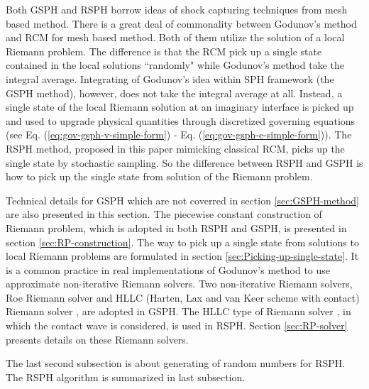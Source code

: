 Both GSPH and RSPH borrow ideas of shock capturing techniques from mesh based method. There is a great deal of commonality between Godunov's method and RCM for mesh based method. Both of them utilize the solution of a local Riemann problem. The difference is that the RCM pick up a single state contained in the local solutions ``randomly" while Godunov's method take the integral average. 
Integrating of Godunov's idea within SPH framework (the GSPH method), however, does not take the integral average at all. Instead, a single state of the local Riemann solution at an imaginary interface is picked up and used to upgrade physical quantities through discretized governing equations (see Eq. (\ref{eq:gov-gsph-v-simple-form}) - Eq. (\ref{eq:gov-gsph-e-simple-form})). The RSPH method, proposed in this paper mimicking classical RCM, picks up the single state by stochastic sampling. So the difference between RSPH and GSPH is how to pick up the single state from solution of the Riemann problem.

Technical details for GSPH which are not coverred in section \ref{sec:GSPH-method} are also presented in this section.
The piecewise constant construction of Riemann problem, which is adopted in both RSPH and GSPH, is presented in section \ref{sec:RP-construction}. The way to pick up a single state from solutions to local Riemann problems are formulated in section \ref{sec:Picking-up-single-state}. It is a common practice in real implementations of Godunov's method to use approximate non-iterative Riemann solvers.
Two non-iterative Riemann solvers, Roe Riemann solver and HLLC (Harten, Lax and van Keer scheme with contact) Riemann solver \citep{toro1994restoration}, are adopted in GSPH. The HLLC type of Riemann solver \citep{toro1994restoration}, in which the contact wave is considered, is used in RSPH. Section \ref{sec:RP-solver} presents details on these Riemann solvers. 

The last second subsection is about generating of random numbers for RSPH. The RSPH algorithm is summarized in last subsection.

